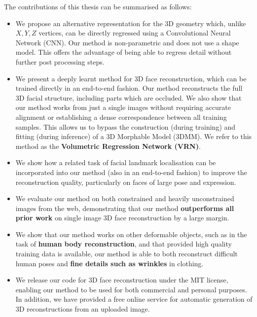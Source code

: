 The contributions of this thesis can be summarised as follows:

\begin{itemize}
\item %
  We propose an alternative representation for the 3D geometry which,
  unlike $X, Y, Z$ vertices, can be directly regressed using a
  Convolutional Neural Network (CNN). Our method is non-parametric and
  does not use a shape model. This offers the advantage of being able
  to regress detail without further post processing steps.

\item %
  We present a deeply learnt method for 3D face reconstruction, which
  can be trained directly in an end-to-end fashion. Our method
  reconstructs the full 3D facial structure, including parts which are
  occluded. We also show that our method works from just a single
  images without requiring accurate alignment or establishing a dense
  correspondence between all training samples.  This allows us to
  bypass the construction (during training) and fitting (during
  inference) of a 3D Morphable Model (3DMM).  We refer to this method
  as the \textbf{Volumetric Regression Network (VRN)}.

\item We show how a related task of facial landmark localisation can
  be incorporated into our method (also in an end-to-end fashion) to
  improve the reconstruction quality, particularly on faces of large
  pose and expression.

\item We evaluate our method on both constrained and heavily
  unconstrained images from the web, demonstrating that our method
  \textbf{outperforms all prior work} on single image 3D face
  reconstruction by a large margin.

\item We show that our method works on other deformable objects, such
  as in the task of \textbf{human body reconstruction}, and that
  provided high quality training data is available, our method is able
  to both reconstruct difficult human poses and \textbf{fine details
    such as wrinkles} in clothing.

\item We release our code for 3D face reconstruction under the MIT
  license, enabling our method to be used for both commercial and
  personal purposes. In addition, we have provided a free online
  service for automatic generation of 3D reconstructions from an
  uploaded image.
\end{itemize}

